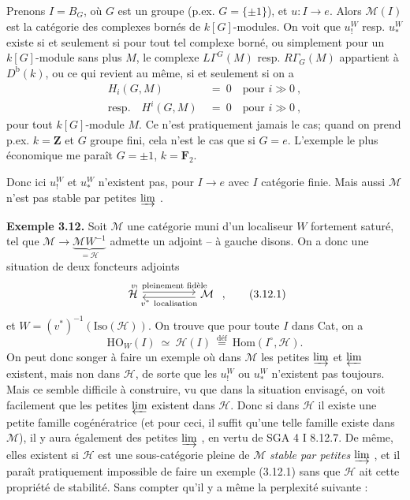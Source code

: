 \documentclass[11pt]{article}
\newcommand{\printedpage}[1]{\marginpar{\footnotesize p.~#1}}
\newcommand{\msp}[1]{\marginpar{\footnotesize [#1]}}
\newcommand{\limind}{\varinjlim}
\newcommand{\limproj}{\varprojlim}
\begin{document}
Prenons $I=B_G$, où $G$ est un groupe (p.ex. $G=\{\pm1\}$), et $u : I \longrightarrow e$. Alors $\mathcal{M}(I)$ est la catégorie des complexes bornés de $k[G]$-modules. On voit que $u_!^W$ resp. $u_*^W$ existe si et seulement si pour tout tel complexe borné, ou simplement pour un $k[G]$-module sans plus $M$, le complexe $L\Gamma^G(M)$ resp. $R\Gamma_G(M)$ appartient à $D^{\mathrm{b}}(k)$, ou ce qui revient au même,
\printedpage{25}
si et seulement si on a
\[
\begin{aligned}
H_i(G,M) \ &= \ 0 \quad \text{pour } i \gg 0 \ ,\\
\text{resp.}\quad H^i(G,M) \ &= \ 0 \quad \text{pour } i \gg 0 \ ,
\end{aligned}
\]
pour tout $k[G]$-module $M$. Ce n'est pratiquement jamais le cas; quand on prend p.ex. $k=\mathbf{Z}$ et $G$ groupe fini, cela n'est le cas que si $G=e$. L'exemple le plus économique me paraît $G=\pm1$, $k=\mathbf{F}_2$.

\msp{page 46}
Donc ici $u_!^W$ et $u_*^W$ n'existent pas, pour $I \longrightarrow e$ avec $I$ catégorie finie. Mais aussi $\mathcal{M}$ n'est pas stable par petites $\limind$ .

\textbf{Exemple 3.12.} Soit $\mathcal{M}$ une catégorie muni d'un localiseur $W$ fortement saturé, tel que $\mathcal{M} \longrightarrow \underbrace{\mathcal{M}W^{-1}}_{=\mathcal{H}}$ admette un adjoint -- à gauche disons. On a donc une situation de deux foncteurs adjoints %
\[
\begin{tikzcd}[column sep=huge]
\mathcal{H} \arrow[r, shift left, "v_!\ \text{pleinement fidèle}"] & \mathcal{M} \arrow[l, shift left, "v^*\ \text{localisation}"]
\end{tikzcd}
\ , \tag*{(3.12.1)}
\]
et $W=(v^*)^{-1}(\mathrm{Iso}(\mathcal{H}))$. On trouve que pour toute $I$ dans Cat, on a
\[
\mathrm{HO}_W(I) \ \simeq \ \mathcal{H}(I) \ \overset{\text{déf}}{=} \ \mathrm{Hom}(I^\circ,\mathcal{H}). \tag*{(3.12.2)} %
\]
On peut donc songer à faire un exemple où dans $\mathcal{M}$ les petites $\limind$ et $\limproj$ existent, mais non dans $\mathcal{H}$, de sorte que les $u_!^W$ ou $u_*^W$ n'existent pas toujours. Mais ce semble difficile à construire, vu que dans la situation envisagé, on voit facilement que les petites $\limproj$ existent dans $\mathcal{H}$. Donc si dans $\mathcal{H}$ %
\msp{page 47}
il existe une petite famille cogénératrice (et pour ceci, il suffit qu'une telle famille existe dans $\mathcal{M}$), il y aura également des petites $\limind$ , en vertu de SGA 4 I 8.12.7. De même, elles existent si $\mathcal{H}$ est une sous-catégorie pleine de $\mathcal{M}$ \textit{stable par petites} $\limind$ , et il paraît pratiquement impossible de faire un exemple (3.12.1) sans que $\mathcal{H}$ ait cette propriété de stabilité. Sans compter qu'il y a même la perplexité suivante :
\end{document}
